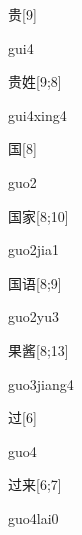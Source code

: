 \begin{verbete}[gui4]{贵}[9]
\begin{pronuncia}{gui4}
\end{pronuncia}
\end{verbete}

\begin{verbete}{贵姓}[9;8]
\begin{pronuncia}{gui4xing4}
\end{pronuncia}
\end{verbete}

\begin{verbete}[guo2]{国}[8]
\begin{pronuncia}{guo2}
\end{pronuncia}
\end{verbete}

\begin{verbete}{国家}[8;10]
\begin{pronuncia}{guo2jia1}
\end{pronuncia}
\end{verbete}

\begin{verbete}[guo2yu3]{国语}[8;9]
\begin{pronuncia}{guo2yu3}
\end{pronuncia}
\end{verbete}

\begin{verbete}{果酱}[8;13]
\begin{pronuncia}{guo3jiang4}
\end{pronuncia}
\end{verbete}

\begin{verbete}[guo4]{过}[6]
\begin{pronuncia}{guo4}
\end{pronuncia}
\end{verbete}

\begin{verbete}{过来}[6;7]
\begin{pronuncia}{guo4lai0}
\end{pronuncia}
\end{verbete}

